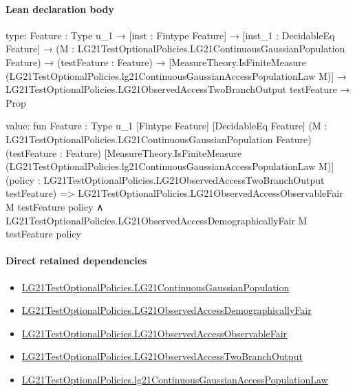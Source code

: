 \documentclass[10pt]{article}
\begin{document}
\paragraph{Lean declaration body}
\begin{ReviewVerbatim}
type:
{Feature : Type u_1} →
  [inst : Fintype Feature] →
    [inst_1 : DecidableEq Feature] →
      (M : LG21TestOptionalPolicies.LG21ContinuousGaussianPopulation Feature) →
        (testFeature : Feature) →
          [MeasureTheory.IsFiniteMeasure (LG21TestOptionalPolicies.lg21ContinuousGaussianAccessPopulationLaw M)] →
            LG21TestOptionalPolicies.LG21ObservedAccessTwoBranchOutput testFeature → Prop

value:
fun {Feature : Type u_1} [Fintype Feature] [DecidableEq Feature]
    (M : LG21TestOptionalPolicies.LG21ContinuousGaussianPopulation Feature) (testFeature : Feature)
    [MeasureTheory.IsFiniteMeasure (LG21TestOptionalPolicies.lg21ContinuousGaussianAccessPopulationLaw M)]
    (policy : LG21TestOptionalPolicies.LG21ObservedAccessTwoBranchOutput testFeature) =>
  LG21TestOptionalPolicies.LG21ObservedAccessObservableFair M testFeature policy ∧
    LG21TestOptionalPolicies.LG21ObservedAccessDemographicallyFair M testFeature policy
\end{ReviewVerbatim}

\paragraph{Direct retained dependencies}
\begin{itemize}\raggedright
\item \hyperlink{paper-prerequisite-f5e1c886d250142b}{LG21\allowbreak{}Test\allowbreak{}Optional\allowbreak{}Policies.\allowbreak{}LG21\allowbreak{}Continuous\allowbreak{}Gaussian\allowbreak{}Population}
\item \hyperlink{governing-declaration-18a34a17bc35164d}{LG21\allowbreak{}Test\allowbreak{}Optional\allowbreak{}Policies.\allowbreak{}LG21\allowbreak{}Observed\allowbreak{}Access\allowbreak{}Demographically\allowbreak{}Fair}
\item \hyperlink{governing-declaration-f5d179a08ffc6c16}{LG21\allowbreak{}Test\allowbreak{}Optional\allowbreak{}Policies.\allowbreak{}LG21\allowbreak{}Observed\allowbreak{}Access\allowbreak{}Observable\allowbreak{}Fair}
\item \hyperlink{governing-declaration-f2c986c14a1e4187}{LG21\allowbreak{}Test\allowbreak{}Optional\allowbreak{}Policies.\allowbreak{}LG21\allowbreak{}Observed\allowbreak{}Access\allowbreak{}Two\allowbreak{}Branch\allowbreak{}Output}
\item \hyperlink{governing-declaration-fa49b6c4b938413f}{LG21\allowbreak{}Test\allowbreak{}Optional\allowbreak{}Policies.\allowbreak{}lg21\allowbreak{}Continuous\allowbreak{}Gaussian\allowbreak{}Access\allowbreak{}Population\allowbreak{}Law}
\end{itemize}
\hypertarget{governing-declaration-45e0a86848ecc1d9}{}
\end{document}

